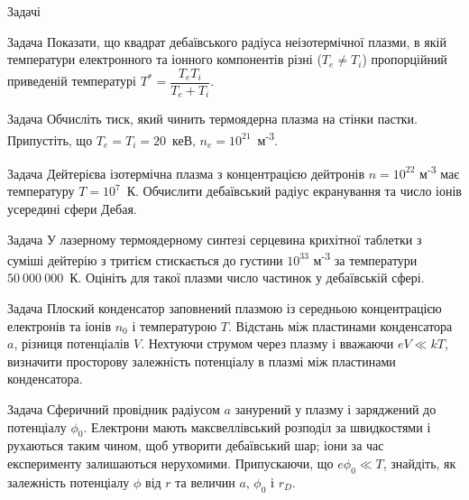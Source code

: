 \documentclass[]{beamer}
\newcounter{probcnt}
\begin{document}
\begin{frame}{Задачі}{}
	\begin{overprint}

		\begin{exampleblock}{\scriptsize Задача \theprobcnt}\justifying\scriptsize
			Показати, що квадрат дебаївського радіуса неізотермічної плазми, в якій температури електронного та іонного компонентів різні ($T_e \neq T_i$) пропорційний приведеній температурі $T^* = \dfrac{T_eT_i}{T_e + T_i}$.
		\end{exampleblock}

		\begin{exampleblock}{\scriptsize Задача \theprobcnt}\justifying\scriptsize
			Обчисліть тиск, який чинить  термоядерна плазма на стінки пастки. Припустіть, що $T_e = T_i = 20$~кеВ, $n_e = 10^{21}$~м\textsuperscript{-3}.
		\end{exampleblock}
		\begin{exampleblock}{\scriptsize Задача \theprobcnt}\justifying\scriptsize
			Дейтерієва ізотермічна плазма з концентрацією дейтронів $n = 10^{22}$ м\textsuperscript{-3} має температуру $T = 10^7$~К. Обчислити дебаївський радіус екранування та число іонів усередині сфери Дебая.
		\end{exampleblock}
		\begin{exampleblock}{\scriptsize Задача \theprobcnt}\justifying\scriptsize
			У лазерному термоядерному синтезі серцевина крихітної таблетки з
			суміші дейтерію з тритієм стискається до густини $10^{33}$ м\textsuperscript{-3} за
			температури $50\ 000\ 000$~К. Оцініть для такої плазми число частинок у дебаївській сфері.
		\end{exampleblock}
		\setcounter{probcnt}{5}
		\begin{exampleblock}{\scriptsize Задача \theprobcnt}\justifying\scriptsize
			Плоский конденсатор заповнений плазмою із середньою
			концентрацією електронів та іонів $n_0$ і температурою $T$. Відстань
			між пластинами конденсатора $a$, різниця потенціалів $V$.
			Нехтуючи струмом через плазму і вважаючи $eV \ll kT$, визначити
			просторову залежність потенціалу в плазмі між пластинами
			конденсатора.
		\end{exampleblock}

		\begin{exampleblock}{\scriptsize Задача \theprobcnt}\justifying\scriptsize
			Сферичний провідник радіусом $a$ занурений у плазму і заряджений до потенціалу $\phi_0$. Електрони мають максвеллівський розподіл за швидкостями і рухаються таким чином, щоб утворити дебаївський шар; іони за час експерименту залишаються нерухомими. Припускаючи, що $e\phi_0 \ll T$, знайдіть, як залежність потенціалу $\phi$ від $r$ та величин $a$, $\phi_0$ і $r_D$.
		\end{exampleblock}


\end{overprint}
\end{frame}
\end{document}
